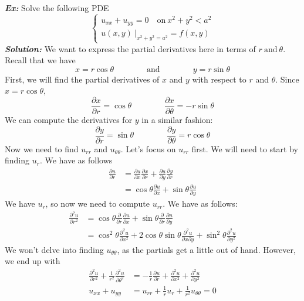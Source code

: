 \documentclass{article}
\begin{document}
\noindent \textbf{\textit{Ex:}} Solve the following PDE
\[
\begin{cases*}
u_{xx} + u_{yy} = 0\quad \text{on}\ x^{2} + y^{2} < a^{2}\\
u(x,y)\ \big |_{x^{2} + y^{2} = a^{2}} = f(x,y)
\end{cases*}
\]
\indent \textbf{\textit{Solution:}} We want to express the partial derivatives here in terms of $r\ \text{and}\ \theta$. Recall that we have
\[
x = r\cos{\theta} \qquad\qquad \text{and} \qquad\qquad y = r\sin{\theta}
\]
First, we will find the partial derivatives of $x$ and $y$ with respect to $r$ and $\theta$. Since $x = r\cos{\theta}$, 
\[
\frac{\partial x}{\partial r} = \cos{\theta} \qquad\qquad \frac{\partial x}{\partial \theta} = -r\sin{\theta}
\]
We can compute the derivatives for $y$ in a similar fashion:
\[
\frac{\partial y}{\partial r} = \sin{\theta} \qquad\qquad \frac{\partial y}{\partial \theta} = r\cos{\theta}
\]
Now we need to find $u_{rr}$ and $u_{\theta\theta}$. Let's focus on $u_{rr}$ first. We will need to start by finding $u_{r}$. We have as follows
\begin{align*}
\frac{\partial u}{\partial r}& = \frac{\partial u}{\partial x}\frac{\partial x}{\partial r} + \frac{\partial u}{\partial y}\frac{\partial y}{\partial r}\\
&= \cos{\theta}\frac{\partial u}{\partial x} + \sin{\theta}\frac{\partial u}{\partial y}
\end{align*}
We have $u_{r}$, so now we need to compute $u_{rr}$. We have as follows:
\begin{align*}
\frac{\partial^{2} u}{\partial r^{2}} &= \cos{\theta}\frac{\partial }{\partial r}\frac{\partial u}{\partial x} + \sin{\theta}\frac{\partial }{\partial r}\frac{\partial u}{\partial y}\\
&= \cos^{2}{\theta}\frac{\partial^{2} u}{\partial x^{2}} + 2\cos{\theta}\sin{\theta}\frac{\partial^{2}u}{\partial x\partial y} + \sin^{2}{\theta}\frac{\partial^{2} u}{\partial y^{2}}
\end{align*}
We won't delve into finding $u_{\theta\theta}$, as the partials get a little out of hand. However, we end up with
\begin{align*}
\frac{\partial^{2}u}{\partial r^{2}} + \frac{1}{r^{2}}\frac{\partial^{2}u}{\partial\theta^{2}} &= -\frac{1}{r}\frac{\partial u}{\partial r} + \frac{\partial^{2} u}{\partial x^{2}} + \frac{\partial^{2} u}{\partial y^{2}}\\
u_{xx} + u_{yy} &= u_{rr} + \frac{1}{r}u_{r} + \frac{1}{r^{2}}u_{\theta\theta} = 0
\end{align*}
\end{document}
